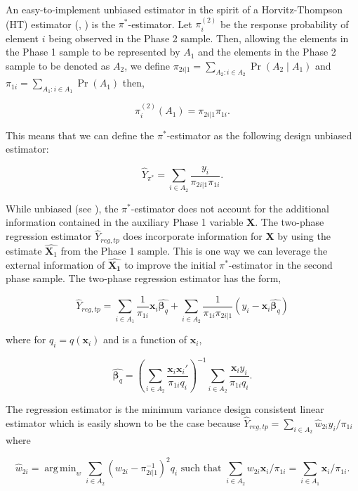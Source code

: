 \documentclass[12pt]{article}
\DeclareMathOperator*{\argmin}{arg\,min}
\renewcommand{\bf}[1]{\mathbf{#1}}
\begin{document}
An easy-to-implement unbiased estimator in the spirit of a Horvitz-Thompson (HT)
estimator (\cite{horvitz1952generalization}, \cite{narain1951sampling}) is the
$\pi^*$-estimator. Let $\pi_i^{(2)}$ be the response probability of element $i$
being observed in the Phase 2 sample. Then, allowing the elements in the Phase 1
sample to be represented by $A_1$ and the elements in the Phase 2 sample to be
denoted as $A_2$,
we define $\pi_{2i | 1} = \sum_{A_2: i \in A_2} \Pr(A_2 \mid A_1)$ and
$\pi_{1i} = \sum_{A_1: i \in A_1} \Pr(A_1)$ then,

$$ \pi_i^{(2)}(A_1) = \pi_{2i | 1} \pi_{1i}.$$

This means that we can define the $\pi^*$-estimator as the following design
unbiased estimator:

$$ \hat Y_{\pi^*} = \sum_{i \in A_2} \frac{y_i}{\pi_{2i | 1} \pi_{1i}}.$$

While unbiased (see \cite{kim2024statistics}), the $\pi^*$-estimator does not
account for the additional information contained in the auxiliary Phase 1
variable $\bf X$. The two-phase regression estimator $\hat Y_{reg, tp}$ does
incorporate information for $\bf X$ by using the estimate $\hat{\bf X_1}$ from
the Phase 1 sample. This is one way we can leverage the external information of 
$\hat{\bf{X_1}}$ to improve the initial $\pi^*$-estimator in the second phase
sample. The two-phase regression estimator has the form,

$$ 
\hat Y_{reg, tp} 
= \sum_{i \in A_1} \frac{1}{\pi_{1i}} \bf x_i \hat{\bm \beta_q} + 
\sum_{i \in A_2} \frac{1}{\pi_{1i}\pi_{2i|1}} (y_i - \bf x_i \hat{\bm \beta_q})
$$

where for $q_i = q(\bf x_i)$ and is a function of $\bf x_i$,

$$
\hat{\bm \beta_q} = \left(\sum_{i \in A_2} 
  \frac{\bf x_i \bf x_i'}{\pi_{1i} q_i}\right)^{-1} 
\sum_{i \in A_2} \frac{\bf x_i y_i}{\pi_{1i} q_i}.
$$ 

The regression estimator is the minimum variance design consistent linear
estimator which is easily shown to be the case because $\hat Y_{reg, tp} =
\sum_{i \in A_2} \hat w_{2i} y_i / \pi_{1i}$ where 

$$
\hat w_{2i} = \argmin_{w} \sum_{i \in A_2} (w_{2i} - \pi_{2i|1}^{-1})^2 q_i
\text{ such that } \sum_{i \in A_2} w_{2i} \bf x_i / \pi_{1i} = \sum_{i \in A_1}
\bf x_i / \pi_{1i}.
$$
\end{document}
